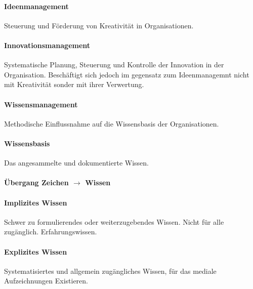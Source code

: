 \documentclass[twocolumn]{article}
\begin{document}
\paragraph{Ideenmanagement}
	Steuerung und Förderung von Kreativität in Organisationen.

\paragraph{Innovationsmanagement}
	Systematische Planung, Steuerung und Kontrolle der Innovation in der Organisation. Beschäftigt sich jedoch im gegensatz zum Ideenmanagemnt nicht mit Kreativität sonder mit ihrer Verwertung.

\paragraph{Wissensmanagement}
	Methodische Einflussnahme auf die Wissensbasis der Organisationen.

\paragraph{Wissensbasis}
	Das angesammelte und dokumentierte Wissen.

\paragraph{Übergang Zeichen $\rightarrow$ Wissen \\}

\paragraph{Implizites Wissen}
	Schwer zu formulierendes oder weiterzugebendes Wissen. Nicht für alle zugänglich. Erfahrungswissen.

\paragraph{Explizites Wissen}
	Systematisiertes und allgemein zugängliches Wissen, für das mediale Aufzeichnungen Existieren.
\end{document}
